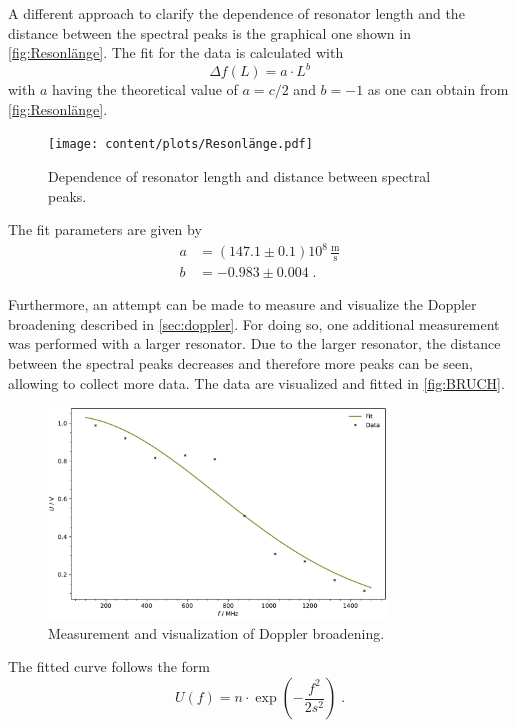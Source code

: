 A different approach to clarify the dependence of resonator length and the distance between the spectral peaks is the graphical one shown in \autoref{fig:Resonlänge}. The fit for the data is calculated with 
\begin{equation*}
    \Delta f(L)=a\cdot L^{b}
\end{equation*}
with $a$ having the theoretical value of $a=c/2$ and $b=-1$ as one can obtain from \autoref{fig:Resonlänge}.
\begin{figure}[h!]
    \centering
    \texttt{[image: content/plots/Resonlänge.pdf]}
    \caption{Dependence of resonator length and distance between spectral peaks.}
    \label{fig:Resonlänge}
\end{figure}
The fit parameters are given by 
\begin{align*}
    a&= (147.1 \pm 0.1) 10^8\, \frac{\text{m}}{\text{s}} \\
    b&= -0.983 \pm 0.004\; .
\end{align*}

Furthermore, an attempt can be made to measure and visualize the Doppler broadening described in \autoref{sec:doppler}. For doing so, one additional measurement was performed with a larger resonator. Due to the larger resonator, the distance between the spectral peaks decreases and therefore more peaks can be seen, allowing to collect more data. The data are visualized and fitted in \autoref{fig:BRUCH}.
\begin{figure}[h!]
    \centering
    \includegraphics[width=0.8\textwidth]{content/plots/AUA.pdf}
    \caption{Measurement and visualization of Doppler broadening.}
    \label{fig:BRUCH}
\end{figure}
The fitted curve follows the form 
\begin{equation*}
    U(f)= n\cdot \exp\left(-\frac{f^2}{2s^2}\right)\; .
\end{equation*}


